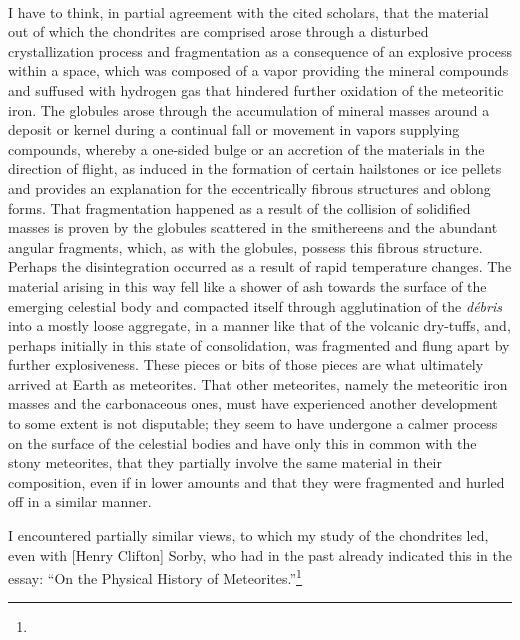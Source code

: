 \documentclass[a4paper, 12pt, oneside]{article}
\begin{document}
\paragraph*{}
I have to think, in partial agreement with the cited scholars, that the material out of which the chondrites are comprised arose through a disturbed crystallization process and fragmentation as a consequence of an explosive process within a space, which was composed of a vapor providing the mineral compounds and suffused with hydrogen gas that hindered further oxidation of the meteoritic iron. The globules arose through the accumulation of mineral masses around a deposit or kernel during a continual fall or movement in vapors supplying compounds, whereby a one-sided bulge or an accretion of the materials in the direction of flight, as induced in the formation of certain hailstones or ice pellets and provides an explanation for the eccentrically fibrous structures and oblong forms. That fragmentation happened as a result of the collision of solidified masses is proven by the globules scattered in the smithereens and the abundant angular fragments, which, as with the globules, possess this fibrous structure. Perhaps the disintegration occurred as a result of rapid temperature changes. The material arising in this way fell like a shower of ash towards the surface of the emerging celestial body and compacted itself through agglutination of the \emph{débris} into a mostly loose aggregate, in a manner like that of the volcanic dry-tuffs, and, perhaps initially in this state of consolidation, was fragmented and flung apart by further explosiveness. These pieces or bits of those pieces are what ultimately arrived at Earth as meteorites. That other meteorites, namely the meteoritic iron masses and the carbonaceous ones, must have experienced another development to some extent is not disputable; they seem to have undergone a calmer process on the surface of the celestial bodies and have only this in common with the stony meteorites, that they partially involve the same material in their composition, even if in lower amounts and that they were fragmented and hurled off in a similar manner.

I encountered partially similar views, to which my study of the chondrites led, even with [Henry Clifton] Sorby, who had in the past already indicated this in the essay: ``On the Physical History of Meteorites.''\footnote{}
\end{document}
